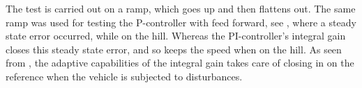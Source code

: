 %
The test is carried out on a ramp, which goes up and then flattens out. The same ramp was used for testing the P-controller with feed forward, see , where a steady state error occurred, while on the hill. Whereas the PI-controller's integral gain closes this steady state error, and so keeps the speed when on the hill.
As seen from , the adaptive capabilities of the integral gain takes care of closing in on the reference when the vehicle is subjected to disturbances.
%

%
%